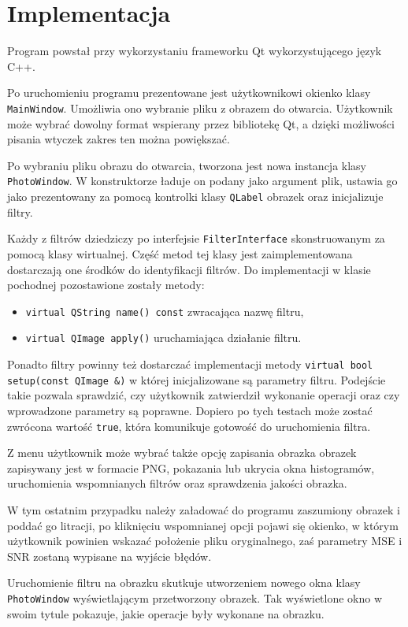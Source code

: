 \documentclass{classrep}
\begin{document}
\section{Implementacja}
Program powstał przy wykorzystaniu frameworku Qt wykorzystującego język C++.

Po uruchomieniu programu prezentowane jest użytkownikowi okienko klasy \texttt{MainWindow}. Umożliwia ono wybranie pliku z obrazem do otwarcia. Użytkownik może wybrać dowolny format wspierany przez bibliotekę Qt, a dzięki możliwości pisania wtyczek \ppauza zakres ten można powiększać.

Po wybraniu pliku obrazu do otwarcia, tworzona jest nowa instancja klasy \texttt{PhotoWindow}. W konstruktorze ładuje on podany jako argument plik, ustawia go jako prezentowany za pomocą kontrolki klasy \texttt{QLabel} obrazek oraz inicjalizuje filtry.

Każdy z filtrów dziedziczy po interfejsie \texttt{FilterInterface} skonstruowanym za pomocą klasy wirtualnej. Część metod tej klasy jest zaimplementowana \ppauza dostarczają one środków do identyfikacji filtrów. Do implementacji w klasie pochodnej pozostawione zostały metody:
\begin{itemize}
 \item \texttt{virtual QString name() const} \ppauza zwracająca nazwę filtru,
 \item \texttt{virtual QImage apply()} \ppauza uruchamiająca działanie filtru.
\end{itemize}

Ponadto filtry powinny też dostarczać implementacji metody \texttt{virtual bool setup(const QImage \&)} w której inicjalizowane są parametry filtru. Podejście takie pozwala sprawdzić, czy użytkownik zatwierdził wykonanie operacji oraz czy wprowadzone parametry są poprawne. Dopiero po tych testach może zostać zwrócona wartość \texttt{true}, która komunikuje gotowość do uruchomienia filtra.

Z menu użytkownik może wybrać także opcję zapisania obrazka \ppauza obrazek zapisywany jest w formacie PNG, pokazania lub ukrycia okna histogramów, uruchomienia wspomnianych filtrów oraz sprawdzenia jakości obrazka.

W tym ostatnim przypadku należy załadować do programu zaszumiony obrazek i poddać go litracji, po kliknięciu wspomnianej opcji pojawi się okienko, w którym użytkownik powinien wskazać położenie pliku oryginalnego, zaś parametry MSE i SNR zostaną wypisane na wyjście błędów.

Uruchomienie filtru na obrazku skutkuje utworzeniem nowego okna klasy \texttt{PhotoWindow} wyświetlającym przetworzony obrazek. Tak wyświetlone okno w swoim tytule pokazuje, jakie operacje były wykonane na obrazku.
\end{document}
